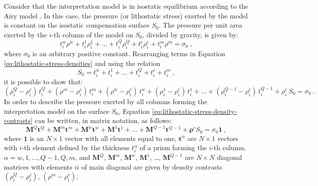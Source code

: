 \documentclass[manuscript]{geophysics}
\begin{document}
Consider that the interpretation model is in isostatic equilibrium according to the
Airy model \citep{turcotte-schubert2002, hofmann-wellenhof-moritz2005, lowrie2007}.
In this case, the pressure (or lithostatic stress) exerted by the model is constant 
on the isostatic compensation surface $S_{0}$. The pressure per unit area 
exerted by the $i$-th column of the model on $S_{0}$, divided by gravity, 
is given by:
\begin{equation}
t^{w}_{i} \rho^{w} + t^{1}_{i} \rho^{1}_{i} + \dots + t^{Q}_{i} \rho^{Q}_{i} + 
t^{c}_{i} \rho^{c}_{i} + t^{m}_{i} \rho^{m} = \sigma_{0} \: ,
\label{eq:lithostatic-stress-densities}
\end{equation}
where $\sigma_{0}$ is an arbitrary positive constant. Rearranging terms in Equation
\ref{eq:lithostatic-stress-densities} and using the relation
\begin{equation}
S_{0} = t^{w}_{i} + t^{1}_{i} + \dots + t^{Q}_{i} + t^{c}_{i} + t^{m}_{i} \: ,
\label{eq:S0}
\end{equation}
it is possible to show that:
\begin{equation}
(\rho^{Q}_{i} - \rho^{c}_{i}) \, t^{Q}_{i} + (\rho^{m} - \rho^{c}_{i}) \, t^{m}_{i} +
(\rho^{w} - \rho^{c}_{i}) \, t^{w}_{i} + (\rho^{1}_{i} - \rho^{c}_{i}) \, t^{1}_{i} +
\dots + (\rho^{Q-1}_{i} - \rho^{c}_{i}) \, t^{Q-1}_{i} + \rho^{c}_{i} \, S_{0} =
\sigma_{0} \: .
\label{eq:lithostatic-stress-density-contrasts}
\end{equation}
In order to describe the pressure exerted by all columns forming the interpretation
model on the surface $S_{0}$, Equation \ref{eq:lithostatic-stress-density-contrasts}
can be written, in matrix notation, as follows:
\begin{equation}
\mathbf{M}^{Q} \mathbf{t}^{Q} + \mathbf{M}^{m} \mathbf{t}^{m} + \mathbf{M}^{w}
\mathbf{t}^{w} + \mathbf{M}^{1} \mathbf{t}^{1} + \dots + \mathbf{M}^{Q-1}
\mathbf{t}^{Q-1} + \boldsymbol{\rho}^{c} S_{0} = \sigma_{0} \mathbf{1} \: ,
\label{eq:lithostatic-stress-matrix}
\end{equation}
where $\mathbf{1}$ is an $N \times 1$ vector with all elements equal to one, 
$\mathbf{t}^{\alpha}$ are $N \times 1$ vectors with $i$-th element defined by the
thickness $t^{\alpha}_{i}$ of a prism forming the $i$-th column, 
$\alpha = w, 1, \dots, Q-1, Q, m$, and $\mathbf{M}^{Q}$, $\mathbf{M}^{m}$, 
$\mathbf{M}^{w}$, $\mathbf{M}^{1}$, \dots, $\mathbf{M}^{Q-1}$ are $N \times N$ diagonal
matrices with elements $ii$ of main diagonal are given by density contrasts
$(\rho^{Q}_{i} - \rho^{c}_{i})$, $(\rho^{m} - \rho^{c}_{i})$, 
\end{document}
